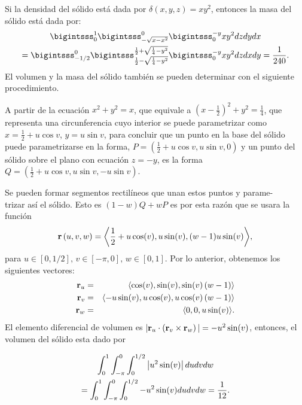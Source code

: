 Si la densidad del sólido está dada por $\delta(x,y,z) =xy^{2}$, entonces la masa del sólido está dada por:
\begin{multline*} \bigintsss_{0}^{1}\bigintsss_{-\sqrt{x-x^{2}}}^{0}\bigintsss_{0}^{-y}xy^{2}dzdydx \\ =\bigintsss_{-1/2}^{0}\bigintsss_{\frac{1}{2}-\sqrt{\frac{1}{4}-y^{2}}}^{\frac{1}{2}+\sqrt{\frac{1}{4}-y^{2}}}\bigintsss_{0}^{-y}xy^{2}dzdxdy= \frac{1}{240}.
\end{multline*}
El volumen y la masa del sólido también se pueden determinar con el siguiente procedimiento.

A partir de la ecuación $x^{2}+y^{2}=x$, que equivale a
$\left( x-\frac{1}{2}\right) ^{2}+y^{2}=\frac{1}{4}$, que representa una circunferencia cuyo interior se puede parametrizar como $x=\frac{1}{2}+u\cos v$, $y=u\sin v$, para concluir que un punto en la base del sólido puede parametrizarse en la forma,
$P=\left( \frac{1}{2}+u\cos v,u\sin v,0\right) $ y un punto del sólido sobre el plano con ecuación $z=-y$, es la forma
$Q=\left( \frac{1}{2}+u\cos v,u\sin v,-u\sin v\right)$.

Se pueden formar segmentos rectilíneos que unan estos puntos y parame- \\ trizar así el sólido. Esto es $(1-w)Q+wP$
es por esta razón que se usara la función
\[{\bf r}\left( u,v,w\right) =\left\langle \frac{1}{2}+u\cos (v) ,u\sin
(v) , (w-1)u\sin (v) \right\rangle\!,\]
para $u\in [0,1/2],\,v\in [-\pi,0],\,w\in [0,1]$. Por lo anterior, obtenemos los siguientes vectores:
\begin{eqnarray*}
  {\bf r}_{u}&=&\langle \cos (v) ,\sin (v),\sin (v) \left( w-1\right) \rangle\\
  {\bf r}_{v}&=&\langle -u\sin (v) ,u\cos (v) ,u\cos(v) \left( w-1\right) \rangle\\
  {\bf r}_{w}&=& \langle 0,0,u\sin (v) \rangle.
\end{eqnarray*}
El elemento diferencial de volumen es
$| {\bf r}_{u}\cdot \left( {\bf r}_{v}\times {\bf r}_{w}\right)| =-u^{2}\sin (v) $,
entonces, el volumen del sólido esta dado por

{\small
  \begin{multline*}
    \displaystyle \int_{0}^{1}\displaystyle \int_{-\pi }^{0}\displaystyle \int_{0}^{1/2}\left| u^{2}\sin (v)
    \right| dudvdw \\ = \int_{0}^{1}\displaystyle \int_{-\pi }^{0} \int_{0}^{1/2} -u^{2}\sin (v)dudvdw=\frac{1}{12}.
  \end{multline*}
}

